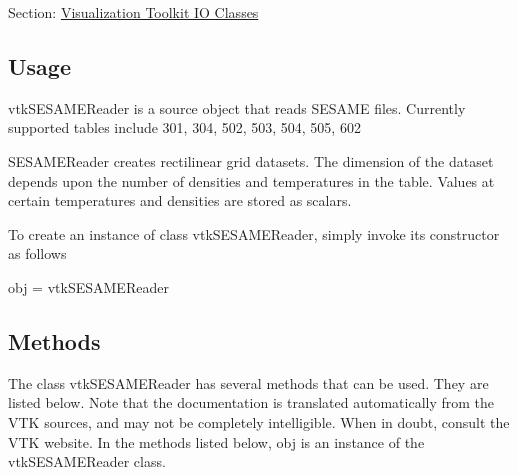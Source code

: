 Section\-: \hyperlink{sec_vtkio}{Visualization Toolkit I\-O Classes} \hypertarget{vtkwidgets_vtkxyplotwidget_Usage}{}\subsection{Usage}\label{vtkwidgets_vtkxyplotwidget_Usage}
vtk\-S\-E\-S\-A\-M\-E\-Reader is a source object that reads S\-E\-S\-A\-M\-E files. Currently supported tables include 301, 304, 502, 503, 504, 505, 602

S\-E\-S\-A\-M\-E\-Reader creates rectilinear grid datasets. The dimension of the dataset depends upon the number of densities and temperatures in the table. Values at certain temperatures and densities are stored as scalars.

To create an instance of class vtk\-S\-E\-S\-A\-M\-E\-Reader, simply invoke its constructor as follows \begin{DoxyVerb}  obj = vtkSESAMEReader
\end{DoxyVerb}
 \hypertarget{vtkwidgets_vtkxyplotwidget_Methods}{}\subsection{Methods}\label{vtkwidgets_vtkxyplotwidget_Methods}
The class vtk\-S\-E\-S\-A\-M\-E\-Reader has several methods that can be used. They are listed below. Note that the documentation is translated automatically from the V\-T\-K sources, and may not be completely intelligible. When in doubt, consult the V\-T\-K website. In the methods listed below, {\ttfamily obj} is an instance of the vtk\-S\-E\-S\-A\-M\-E\-Reader class. 
